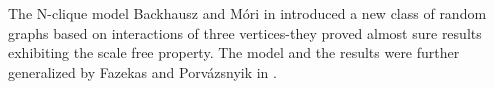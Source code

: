 \begin{block}{The N-clique model}
  \small
  Backhausz and Móri in \cite{BM} introduced a new class of random graphs
  based on interactions of three vertices-they proved almost sure results exhibiting the scale
  free property. The model and the results were further generalized by Fazekas and Porvázsnyik in
  \cite{FP}. 
\end{block}
